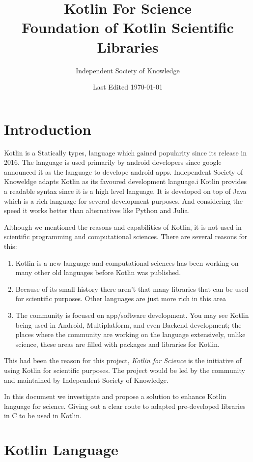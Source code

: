 \documentclass[10pt,twocolumn, a4paper]{article}
\title{Kotlin For Science \\ \large Foundation of Kotlin Scientific Libraries}
\author{Independent Society of Knowledge}
\date{Last Edited \today}
\begin{document}
	\maketitle
	\section{Introduction}
		Kotlin is a Statically types, language which gained popularity since its release in 2016.
		The language is used primarily by android developers since google announced it as the language to develope android apps.
		Independent Society of Knoweldge adapts Kotlin as its favoured development language.i
		Kotlin provides a readable syntax since it is a high level language. 
		It is developed on top of Java which is a rich language for several development purposes. 
		And considering the speed it works better than alternatives like Python and Julia.

		Although we mentioned the reasons and capabilities of Kotlin, it is not used in scientific programming and computational sciences.
		There are several reasons for this:
		\begin{enumerate}
			\item Kotlin is a new language and computational sciences has been working on many other old languages before Kotlin was published.
			\item Because of its small history there aren't that many libraries that can be used for scientific purposes.
				Other languages are just more rich in this area
			\item The community is focused on app/software development.
				You may see Kotlin being used in Android, Multiplatform, and even Backend development; the places where the community are working on the language extensively, unlike science, these areas are filled with packages and libraries for Kotlin.
		\end{enumerate}
		This had been the reason for this project, \textit{Kotlin for Science} is the initiative of using Kotlin for scientific purposes. 
		The project would be led by the community and maintained by Independent Society of Knowledge. 
		
		In this document we investigate and propose a solution to enhance Kotlin language for science. 
		Giving out a clear route to adapted pre-developed libraries in C to be used in Kotlin.
	\section{Kotlin Language}
\end{document}

